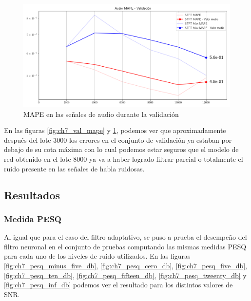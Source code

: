 \begin{figure}
	\centering
	\centerline{\includegraphics[scale=0.65]{images/ch7/entrenamiento/val_audio_mape.png}}
	\caption{MAPE en las señales de audio durante la validación}
	\label{fig:ch7_val_audio_mape}
\end{figure}

En las figuras \ref{fig:ch7_val_mape} y \ref{fig:ch7_val_audio_mape}, podemos ver que aproximadamente después del lote 3000 los errores en el conjunto de validación ya estaban por debajo de su cota máxima con lo cual podemos estar seguros que el modelo de red obtenido en el lote 8000 ya va a haber logrado filtrar parcial o totalmente el ruido presente en las señales de habla ruidosas.

\subsection{Resultados}

\subsubsection{Medida PESQ}

Al igual que para el caso del filtro adaptativo, se puso a prueba el desempeño del filtro neuronal en el conjunto de pruebas computando las mismas medidas PESQ para cada uno de los niveles de ruido utilizados. En las figuras \ref{fig:ch7_pesq_minus_five_db}, \ref{fig:ch7_pesq_cero_db}, \ref{fig:ch7_pesq_five_db}, \ref{fig:ch7_pesq_ten_db}, \ref{fig:ch7_pesq_fifteen_db},
\ref{fig:ch7_pesq_tweenty_db} y \ref{fig:ch7_pesq_inf_db} podemos ver el resultado para los distintos valores de SNR. 

